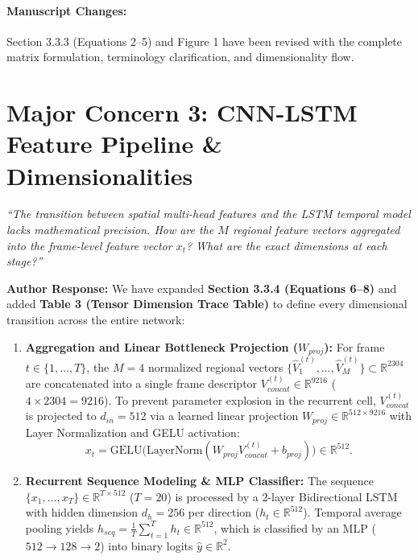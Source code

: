 \documentclass[runningheads]{llncs}
\begin{document}
\paragraph{Manuscript Changes:} Section 3.3.3 (Equations 2--5) and Figure 1 have been revised with the complete matrix formulation, terminology clarification, and dimensionality flow.

\bigskip

\section*{Major Concern 3: CNN-LSTM Feature Pipeline \& Dimensionalities}

\begin{tcolorbox}[colback=gray!10,colframe=gray!50,title=\textbf{Reviewer Comment 3}]
\textit{``The transition between spatial multi-head features and the LSTM temporal model lacks mathematical precision. How are the $M$ regional feature vectors aggregated into the frame-level feature vector $x_t$? What are the exact dimensions at each stage?''}
\end{tcolorbox}

\noindent\textbf{Author Response:} We have expanded \textbf{Section 3.3.4 (Equations 6--8)} and added \textbf{Table 3 (Tensor Dimension Trace Table)} to define every dimensional transition across the entire network:

\begin{enumerate}
    \item \textbf{Aggregation and Linear Bottleneck Projection ($W_{proj}$):}  
    For frame $t \in \{1, \dots, T\}$, the $M=4$ normalized regional vectors $\{\hat{V}_1^{(t)}, \dots, \hat{V}_M^{(t)}\} \subset \mathbb{R}^{2304}$ are concatenated into a single frame descriptor $V_{concat}^{(t)} \in \mathbb{R}^{9216}$ ($4 \times 2304 = 9216$). To prevent parameter explosion in the recurrent cell, $V_{concat}^{(t)}$ is projected to $d_{in}=512$ via a learned linear projection $W_{proj} \in \mathbb{R}^{512 \times 9216}$ with Layer Normalization and GELU activation:
    \begin{equation}
        x_t = \text{GELU}\Big(\text{LayerNorm}(W_{proj} V_{concat}^{(t)} + b_{proj})\Big) \in \mathbb{R}^{512}.
    \end{equation}

    \item \textbf{Recurrent Sequence Modeling \& MLP Classifier:}  
    The sequence $\{x_1, \dots, x_T\} \in \mathbb{R}^{T \times 512}$ ($T=20$) is processed by a 2-layer Bidirectional LSTM with hidden dimension $d_h = 256$ per direction ($h_t \in \mathbb{R}^{512}$). Temporal average pooling yields $h_{seq} = \frac{1}{T}\sum_{t=1}^T h_t \in \mathbb{R}^{512}$, which is classified by an MLP ($512 \to 128 \to 2$) into binary logits $\hat{y} \in \mathbb{R}^2$.
\end{enumerate}
\end{document}
